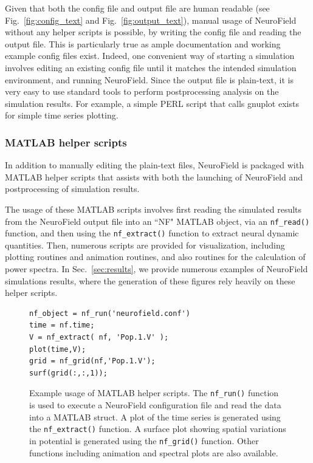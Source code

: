 \documentclass[preprint,review,10pt,authoryear,letterpaper]{elsarticle}
\begin{document}
Given that both the config file and output file are human readable (see Fig.~\ref{fig:config_text} and Fig.~\ref{fig:output_text}), manual usage of NeuroField without any helper scripts is possible, by writing the config file and reading the output file. This is particularly true as ample documentation and working example config files exist. Indeed, one convenient way of starting a simulation involves editing an existing config file until it matches the intended simulation environment, and running NeuroField. Since the output file is plain-text, it is very easy to use standard tools to perform postprocessing analysis on the simulation results. For example, a simple PERL script that calls gnuplot exists for simple time series plotting.

\subsubsection{MATLAB helper scripts}
\label{sec:postprocess-matlab}

In addition to manually editing the plain-text files, NeuroField is packaged with MATLAB helper scripts that assists with both the launching of NeuroField and postprocessing of simulation results.

The usage of these MATLAB scripts involves first reading the simulated results from the NeuroField output file into an ``NF" MATLAB object, via an {\tt nf\_read()} function, and then using the {\tt nf\_extract()} function to extract neural dynamic quantities. Then, numerous scripts are provided for visualization, including plotting routines and animation routines, and also routines for the calculation of power spectra. In Sec.~\ref{sec:results}, we provide numerous examples of NeuroField simulations results, where the generation of these figures rely heavily on these helper scripts.


\begin{figure}[th]
\begin{center}
\begin{lstlisting}[style=Matlab-editor]
nf_object = nf_run('neurofield.conf')
time = nf.time;
V = nf_extract( nf, 'Pop.1.V' );
plot(time,V);
grid = nf_grid(nf,'Pop.1.V');
surf(grid(:,:,1));
\end{lstlisting}
\caption{Example usage of MATLAB helper scripts. The {\tt nf\_run()} function is used to execute a NeuroField configuration file and read the data into a MATLAB struct.  A plot of the time series is generated using the {\tt nf\_extract()} function. A surface plot showing spatial variations in potential is generated using the {\tt nf\_grid()} function.  Other functions including animation and spectral plots are also available.}
\label{fig:matlab_eg}
\end{center}
\end{figure}
\end{document}
